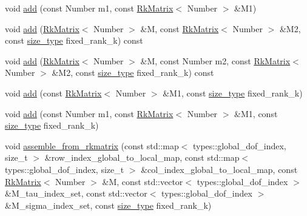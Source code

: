 \begin{DoxyCompactItemize}
\item 
void \hyperlink{classRkMatrix_a93b434797b9142a4dce0c6a64ba1e89c}{add} (const Number m1, const \hyperlink{classRkMatrix}{Rk\+Matrix}$<$ Number $>$ \&M1)
\item 
void \hyperlink{classRkMatrix_ad8668d42978011b3e65d0381bfb068d5}{add} (\hyperlink{classRkMatrix}{Rk\+Matrix}$<$ Number $>$ \&M, const \hyperlink{classRkMatrix}{Rk\+Matrix}$<$ Number $>$ \&M2, const \hyperlink{classRkMatrix_add060bfc3a4cc77f858c3d6dd58cadd5}{size\+\_\+type} fixed\+\_\+rank\+\_\+k) const
\item 
void \hyperlink{classRkMatrix_aeba05e73aa670b1029c1720e56d10e81}{add} (\hyperlink{classRkMatrix}{Rk\+Matrix}$<$ Number $>$ \&M, const Number m2, const \hyperlink{classRkMatrix}{Rk\+Matrix}$<$ Number $>$ \&M2, const \hyperlink{classRkMatrix_add060bfc3a4cc77f858c3d6dd58cadd5}{size\+\_\+type} fixed\+\_\+rank\+\_\+k) const
\item 
void \hyperlink{classRkMatrix_a1f51eac54ddb43c0670a72da62bc1e55}{add} (const \hyperlink{classRkMatrix}{Rk\+Matrix}$<$ Number $>$ \&M1, const \hyperlink{classRkMatrix_add060bfc3a4cc77f858c3d6dd58cadd5}{size\+\_\+type} fixed\+\_\+rank\+\_\+k)
\item 
void \hyperlink{classRkMatrix_adb27c4eacf80d4e94c20ff96eaf5564d}{add} (const Number m1, const \hyperlink{classRkMatrix}{Rk\+Matrix}$<$ Number $>$ \&M1, const \hyperlink{classRkMatrix_add060bfc3a4cc77f858c3d6dd58cadd5}{size\+\_\+type} fixed\+\_\+rank\+\_\+k)
\item 
void \hyperlink{classRkMatrix_a9ff620f9f71181c794e129d71d76da7c}{assemble\+\_\+from\+\_\+rkmatrix} (const std\+::map$<$ types\+::global\+\_\+dof\+\_\+index, size\+\_\+t $>$ \&row\+\_\+index\+\_\+global\+\_\+to\+\_\+local\+\_\+map, const std\+::map$<$ types\+::global\+\_\+dof\+\_\+index, size\+\_\+t $>$ \&col\+\_\+index\+\_\+global\+\_\+to\+\_\+local\+\_\+map, const \hyperlink{classRkMatrix}{Rk\+Matrix}$<$ Number $>$ \&M, const std\+::vector$<$ types\+::global\+\_\+dof\+\_\+index $>$ \&M\+\_\+tau\+\_\+index\+\_\+set, const std\+::vector$<$ types\+::global\+\_\+dof\+\_\+index $>$ \&M\+\_\+sigma\+\_\+index\+\_\+set, const \hyperlink{classRkMatrix_add060bfc3a4cc77f858c3d6dd58cadd5}{size\+\_\+type} fixed\+\_\+rank\+\_\+k)
\end{DoxyCompactItemize}

